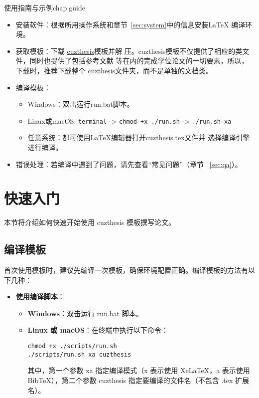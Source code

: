 \begin{cuzchapter}{使用指南与示例}{chap:guide}
    \begin{itemize}
        \item 安装软件：根据所用操作系统和章节~\ref{sec:system}中的信息安装\LaTeX{}
              编译环境。
        \item 获取模板：下载
              \href{https://github.com/xiehao/CUZThesis}{cuzthesis}模板并解
              压。cuzthesis模板不仅提供了相应的类文件，同时也提供了包括参考文献
              等在内的完成学位论文的一切要素，所以，下载时，推荐下载整个
              cuzthesis文件夹，而不是单独的文档类。
        \item 编译模板：
              \begin{itemize}
                  \item Windows：双击运行run.bat脚本。
                  \item Linux或macOS: {\small \verb|terminal| -> \verb|chmod +x ./run.sh| -> \verb|./run.sh xa|}
                  \item 任意系统：都可使用\LaTeX{}编辑器打开cuzthesis.tex文件并
                        选择编译引擎进行编译。
              \end{itemize}
        \item 错误处理：若编译中遇到了问题，请先查看“常见问题”（章节
              ~\ref{sec:qa}）。
    \end{itemize}

    \section{快速入门}\label{sec:quickstart}

    本节将介绍如何快速开始使用 cuzthesis 模板撰写论文。

    \subsection{编译模板}

    首次使用模板时，建议先编译一次模板，确保环境配置正确。编译模板的方法有以下几种：

    \begin{itemize}
        \item \textbf{使用编译脚本}：
        \begin{itemize}
            \item \textbf{Windows}：双击运行 run.bat 脚本。
            \item \textbf{Linux 或 macOS}：在终端中执行以下命令：
            \begin{verbatim}
chmod +x ./scripts/run.sh
./scripts/run.sh xa cuzthesis
            \end{verbatim}
            其中，第一个参数 xa 指定编译模式（x 表示使用 XeLaTeX，a 表示使用 BibTeX），第二个参数 cuzthesis 指定要编译的文件名（不包含 .tex 扩展名）。
        \end{itemize}


\end{itemize}
\end{cuzchapter}
